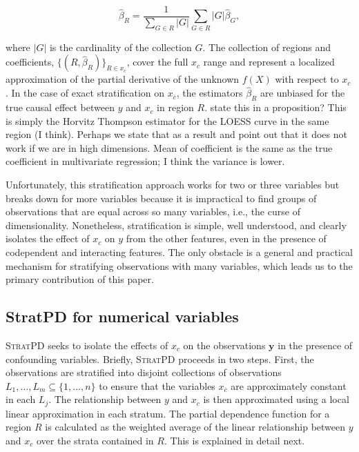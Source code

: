 \documentclass[12pt]{article}
\newcommand{\spd}{\fontfamily{cmr}\textsc{\small StratPD}}
\newcommand{\xnc}{$x_{\overline{c}}$}
\begin{document}
\begin{equation}\label{eq:truebeta}
	\widehat{\beta}_R = \dfrac{1}{\displaystyle\sum_{G \in R} |G|}\displaystyle\sum_{G \in R}|G|\widehat{\beta}_G,
\end{equation}

\noindent where $|G|$ is the cardinality of the collection $G$. The collection of regions and coefficients, $\{(R, \widehat{\beta}_R)\}_{R \in x_c}$, cover the full $x_c$ range and represent a localized approximation of the partial derivative of the unknown $f(X)$ with respect to $x_c$. In the case of exact stratification on \xnc{}, the estimators $\widehat{\beta}_R$ are unbiased for the true causal effect between $y$ and $x_c$ in region $R$. {\color{red} state this in a proposition? This is simply the Horvitz Thompson estimator for the LOESS curve in the same region (I think). Perhaps we state that as a result and point out that it does not work if we are in high dimensions. Mean of coefficient is the same as the true coefficient in multivariate regression; I think the variance is lower.}  

Unfortunately, this stratification approach works for two or three variables but breaks down for more variables because it is impractical to find groups of observations that are equal across so many variables, i.e., the curse of dimensionality.  Nonetheless, stratification is simple, well understood, and clearly isolates the effect of $x_c$ on $y$ from the other features, even in the presence of codependent and interacting features.  The only obstacle is a general and practical mechanism for stratifying observations with many variables, which leads us to the primary contribution of this paper.

\subsection{StratPD for numerical variables}

\spd{} seeks to isolate the effects of $x_c$ on the observations $\mathbf{y}$ in the presence of confounding variables. Briefly, \spd{} proceeds in two steps. First, the observations are stratified into disjoint collections of observations $L_1, \ldots, L_m \subseteq \{1, \ldots, n\}$ to ensure that the variables \xnc{} are approximately constant in each $L_j$. The relationship between $y$ and $x_c$ is then approximated using a local linear approximation in each stratum. The partial dependence function for a region $R$ is calculated as the weighted average of the linear relationship between $y$ and $x_c$ over the strata contained in $R$. This is explained in detail next. 
\end{document}
